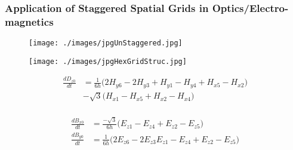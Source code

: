 \documentclass{beamer}
\begin{document}

\begin{frame}
\frametitle{Application of Staggered Spatial Grids in Optics/Electro-magnetics}

\tiny

\begin{figure}
\centering
\begin{minipage}{.5\textwidth}
  \centering
\texttt{[image: ./images/jpgUnStaggered.jpg]}
\label{fig:StaggeredColocated}
\end{minipage}%
\begin{minipage}{.5\textwidth}
  \centering
\texttt{[image: ./images/jpgHexGridStruc.jpg]}
\end{minipage}
\end{figure}

\begin{minipage}{.5\textwidth}
  \centering
\begin{align*}
\frac{d D_{z0}}{dt} &= \frac{1}{6h}\big( 2 H_{y6} - 2 H_{y3} + H_{y1} - H_{y4} + H_{x5} - H_{x2} \big) \\
&- \sqrt{3}\big(H_{x1}- H_{x5} + H_{x2} - H_{x4}\big)\\
\end{align*}
\end{minipage}%
\begin{minipage}{.5\textwidth}
  \centering
\begin{align*}
\frac{d B_{x0}}{dt} &= \frac{-\sqrt{3}}{6h} \big( E_{z1} - E_{z4} + E_{z2} - E_{z5}  \big)\\
\frac{d B_{y0}}{dt}&= \frac{1}{6h} \big( 2E_{z6} -2E_{z3} E_{z1} - E_{z4} + E_{z2} - E_{z5}  \big)
\end{align*}
\end{minipage}
\end{frame}
\end{document}
